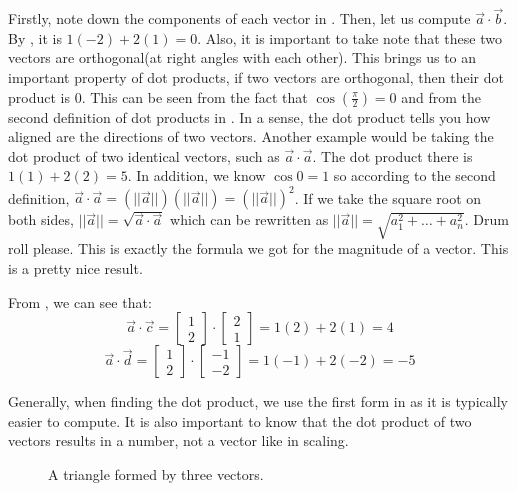 Firstly, note down the components of each vector in . Then, let us compute \(\vec{a}\cdot \vec{b}\). By , it is \(1(-2)+2(1)=0\). Also, it is important to take note that these two vectors are orthogonal(at right angles with each other). This brings us to an important property of dot products, if two vectors are orthogonal, then their dot product is 0. This can be seen from the fact that \(\cos(\frac{\pi}{2})=0\) and from the second definition of dot products in . In a sense, the dot product tells you how aligned are the directions of two vectors. Another example would be taking the dot product of two identical vectors, such as \(\vec{a}\cdot\vec{a}\). The dot product there is \(1(1)+2(2)=5\). In addition, we know \(\cos{0}=1\) so according to the second definition, \(\vec{a}\cdot\vec{a}=(||\vec{a}||)(||\vec{a}||)=(||\vec{a}||)^{2}\). If we take the square root on both sides, \(||\vec{a}||=\sqrt{\vec{a}\cdot\vec{a}}\) which can be rewritten as \(||\vec{a}||=\sqrt{a_{1}^{2}+\dots+a_{n}^{2}}\). Drum roll please. This is exactly the formula we got for the magnitude of a vector. This is a pretty nice result.
\begin{example}
  From , we can see that:
  \begin{equation*}
    \vec{a} \cdot \vec{c} = \begin{bmatrix}
      1 \\
      2
    \end{bmatrix} \cdot \begin{bmatrix}
      2 \\
      1
    \end{bmatrix} = 1(2) + 2(1) = 4
  \end{equation*}
  \begin{equation*}
    \vec{a} \cdot \vec{d} = \begin{bmatrix}
      1 \\
      2
    \end{bmatrix} \cdot \begin{bmatrix}
      -1 \\
      -2
    \end{bmatrix} = 1(-1) + 2(-2) = -5
  \end{equation*}
\end{example}
\begin{remark}
  Generally, when finding the dot product, we use the first form in  as it is typically easier to compute. It is also important to know that the dot product of two vectors results in a number, not a vector like in scaling.
\end{remark}
\begin{figure}[h]
  \centering
  \caption{A triangle formed by three vectors.}
  \label{exvecdotfig}
\end{figure} 


